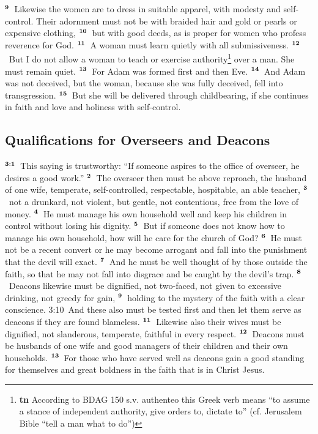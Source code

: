\documentclass[10pt,a4paper,final, twocolumn]{article}
\renewcommand{\textsuperscript}[1]{\ensuremath{^{\textbf{\scriptsize #1}}}}
\begin{document}
\textsuperscript{9} Likewise the women are to dress in suitable apparel, with modesty and self-control. Their adornment must not be with braided hair and gold or pearls or expensive clothing, \textsuperscript{10} but with good deeds, as is proper for women who profess reverence for God. \textsuperscript{11} A woman must learn quietly with all submissiveness. \textsuperscript{12} But I do not allow a woman to teach or exercise authority\footnote{\textbf{tn} According to BDAG 150 s.v. authenteo this Greek verb means “to assume a stance of independent authority, give orders to, dictate to” (cf. Jerusalem Bible ``tell a man what to do”)} over a man. She must remain quiet. \textsuperscript{13} For Adam was formed first and then Eve. \textsuperscript{14} And Adam was not deceived, but the woman, because she was fully deceived, fell into transgression. \textsuperscript{15} But she will be delivered through childbearing, if she continues in faith and love and holiness with self-control. 


\subsection*{Qualifications for Overseers and Deacons}

\textsuperscript{3:1} This saying is trustworthy: “If someone aspires to the office of overseer, he desires a good work.” \textsuperscript{2} The overseer then must be above reproach, the husband of one wife, temperate, self-controlled, respectable, hospitable, an able teacher, \textsuperscript{3} not a drunkard, not violent, but gentle, not contentious, free from the love of money. \textsuperscript{4} He must manage his own household well and keep his children in control without losing his dignity. \textsuperscript{5} But if someone does not know how to manage his own household, how will he care for the church of God? \textsuperscript{6} He must not be a recent convert or he may become arrogant and fall into the punishment that the devil will exact. \textsuperscript{7} And he must be well thought of by those outside the faith, so that he may not fall into disgrace and be caught by the devil’s trap. 
\textsuperscript{8} Deacons likewise must be dignified, not two-faced, not given to excessive drinking, not greedy for gain, \textsuperscript{9} holding to the mystery of the faith with a clear conscience. 3:10 And these also must be tested first and then let them serve as deacons if they are found blameless. \textsuperscript{11} Likewise also their wives must be dignified, not slanderous, temperate, faithful in every respect. \textsuperscript{12} Deacons must be husbands of one wife and good managers of their children and their own households. \textsuperscript{13} For those who have served well as deacons gain a good standing for themselves and great boldness in the faith that is in Christ Jesus. 
\end{document}
